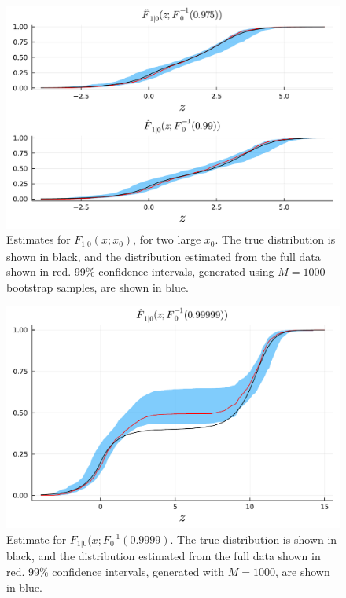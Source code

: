 \documentclass[11pt,twoside,openany]{book}
\numberwithin{Theorem}{chapter}
\numberwithin{Definition}{chapter}
\numberwithin{Lemma}{chapter}
\numberwithin{Algorithm}{chapter}
\numberwithin{equation}{chapter}
\begin{document}
\begin{figure}[htp]
  \centering
  \includegraphics[scale=0.75]{../ht-em/figures/block_bootstrap_Fs_final2.pdf}
  \caption{Estimates for $F_{1|0}(x;x_0)$, for two large $x_0$.
    The true distribution is shown in black, and the distribution estimated from the full data shown in red.
    99\% confidence intervals, generated using $M=1000$ bootstrap samples, are shown in blue.}
    \label{fig:block_bootstrap_Fs_final}
\end{figure}

\begin{figure}[htp]
  \centering
  \includegraphics[scale=0.75]{../ht-em/figures/block_bootstrap_Fs_final_bad_large2.pdf}
  \caption{Estimate for $F_{1|0}(x;F_{0}^{-1}(0.9999)$.
    The true distribution is shown in black, and the distribution estimated from the full data shown in red.
    99\% confidence intervals, generated with $M=1000$, are shown in blue.}
    \label{fig:block_bootstrap_Fs_final_bad_large}
\end{figure}
\end{document}
